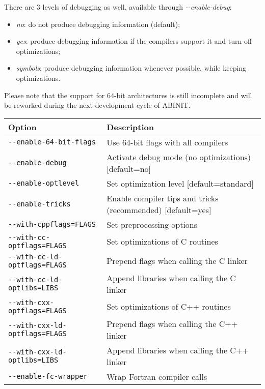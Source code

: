 There are 3 levels of debugging as well, available through
\textit{\hbox{-{-}enable-debug}}:
\begin{itemize}
 \item \textit{no}: do not produce debugging information (default);
 \item \textit{yes}: produce debugging information if the compilers support it
 and turn-off optimizations;
 \item \textit{symbols}: produce debugging information whenever
 possible, while keeping optimizations.
\end{itemize}

Please note that the support for 64-bit architectures is still
incomplete and will be reworked during the next development cycle of
ABINIT.

\begin{table}
\begin{center}
\begin{tabular}{|l|p{9cm}|}
\hline
\textbf{Option} & \textbf{Description} \\
\hline
\texttt{-{-}enable-64-bit-flags}        & Use 64-bit flags with all compilers \\
\texttt{-{-}enable-debug}               & Activate debug mode (no optimizations)
                                        [default=no] \\
\texttt{-{-}enable-optlevel}            & Set optimization level [default=standard] \\
\texttt{-{-}enable-tricks}              & Enable compiler tips and tricks
                                       (recommended) [default=yes] \\
\hline
\texttt{-{-}with-cppflags=FLAGS}        & Set preprocessing options \\
\hline
\texttt{-{-}with-cc-optflags=FLAGS}     & Set optimizations of C routines \\
\texttt{-{-}with-cc-ld-optflags=FLAGS}  & Prepend flags when calling the C linker \\
\texttt{-{-}with-cc-ld-optlibs=LIBS}  & Append libraries when calling the C linker \\
\hline
\texttt{-{-}with-cxx-optflags=FLAGS}    & Set optimizations of C++ routines \\
\texttt{-{-}with-cxx-ld-optflags=FLAGS} & Prepend flags when calling the C++ linker \\
\texttt{-{-}with-cxx-ld-optlibs=LIBS}  & Append libraries when calling the C++ linker \\
\hline
\texttt{-{-}enable-fc-wrapper}          & Wrap Fortran compiler calls

\end{tabular}
\end{center}
\end{table}
